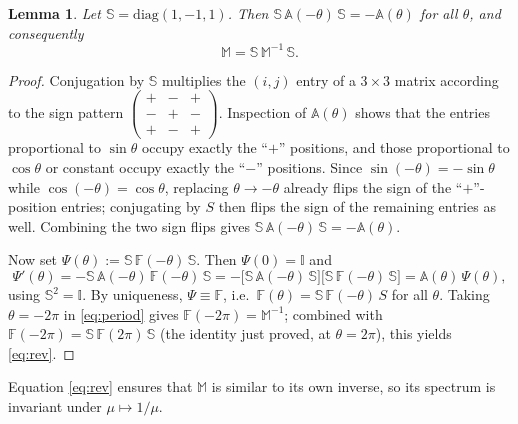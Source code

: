 \documentclass[reqno]{amsart}
\newcommand{\s}{\mathbb{S}}
\newcommand{\F}{\mathbb{F}}
\newcommand{\B}{{\mathfrak{M}}}
\newtheorem{lemma}[theorem]{Lemma}
\begin{document}
\begin{lemma}\label{lem:rev}
Let $\s=\mathrm{diag}(1,-1,1)$. Then $\s\,\mathbb A(-\theta)\,\s=-\mathbb A(\theta)$ for all $\theta$, and consequently
\begin{equation}\label{eq:rev}
\mathbb M=\s\,\mathbb M^{-1}\,\s.
\end{equation}
\end{lemma}
\begin{proof}
Conjugation by $\s$ multiplies the $(i,j)$ entry of a $3\times3$ matrix according to the sign pattern $\left(\begin{smallmatrix}+&-&+\\-&+&-\\+&-&+\end{smallmatrix}\right)$. Inspection of $\mathbb A(\theta)$ shows that the entries proportional to $\sin\theta$ occupy exactly the ``$+$'' positions, and those proportional to $\cos\theta$ or constant occupy exactly the ``$-$'' positions. Since $\sin(-\theta)=-\sin\theta$ while $\cos(-\theta)=\cos\theta$, replacing $\theta\to-\theta$ already flips the sign of the ``$+$''-position entries; conjugating by $S$ then flips the sign of the remaining entries as well. Combining the two sign flips gives $\s\,\mathbb A(-\theta)\,\s=-\mathbb A(\theta)$.

Now set $\Psi(\theta):=\s\,\F(-\theta)\,\s$. Then $\Psi(0)=\mathbb I$ and
\[
\Psi'(\theta)=-\s\,\mathbb A(-\theta)\,\F(-\theta)\,\s=-\big[\s\,\mathbb A(-\theta)\,\s\big]\big[\s\,\F(-\theta)\,\s\big]=\mathbb A(\theta)\,\Psi(\theta),
\]
using $\s^2=\mathbb I$. By uniqueness, $\Psi\equiv\F$, i.e.\ $\F(\theta)=\s\,\F(-\theta)\,S$ for all $\theta$. Taking $\theta=-2\pi$ in \eqref{eq:period} gives $\F(-2\pi)=\mathbb M^{-1}$; combined with $\F(-2\pi)=\s\,\F(2\pi)\,\s$ (the identity just proved, at $\theta=2\pi$), this yields \eqref{eq:rev}.
\end{proof}
\noindent
Equation \eqref{eq:rev} ensures that $\mathbb M$ is similar to its own inverse, so its spectrum is invariant under $\mu\mapsto1/\mu$. %
\end{document}
